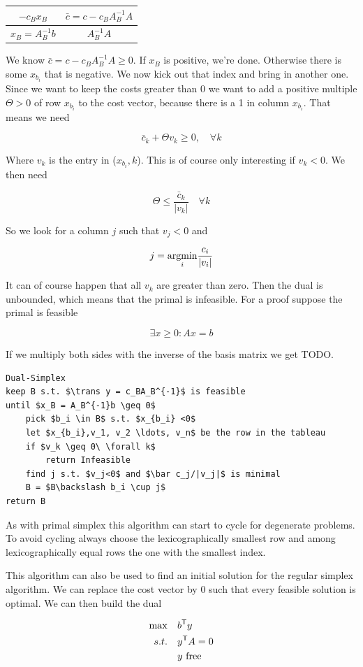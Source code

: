 \begin{center}
\begin{tabular}{c|c}
$-c_Bx_B$ & $\bar c = c-c_BA_B^{-1}A$\\\hline
$x_B=A_B^{-1}b$ & $A_B^{-1}A$ 
\end{tabular}
\end{center}

We know $\bar c = c-c_BA_B^{-1}A \geq 0$. If $x_B$ is positive, we're done. Otherwise there is some $x_{b_i}$ that is negative. We now kick out that index and bring in another one. Since we want to keep the costs greater than 0 we want to add a positive multiple $\Theta > 0$ of row $x_{b_i}$ to the cost vector, because there is a 1 in column $x_{b_i}$. That means we need

\[\bar c_k + \Theta v_k \geq 0,\quad \forall k\]

Where $v_k$ is the entry in ($x_{b_i}, k$). This is of course only interesting if $v_k<0$. We then need 

\[ \Theta \leq \frac{\bar c_k}{|v_k|} \quad \forall k\]

So we look for a column $j$ such that $v_j<0$ and 

\[j = \underset{i}{\operatorname{argmin}} \frac{c_i}{|v_i|}\]

It can of course happen that all $v_k$ are greater than zero. Then the dual is unbounded, which means that the primal is infeasible. For a proof suppose the primal is feasible

\[\exists x\geq 0: Ax=b\]

If we multiply both sides with the inverse of the basis matrix we get TODO.

\begin{lstlisting}
Dual-Simplex
keep B s.t. $\trans y = c_BA_B^{-1}$ is feasible
until $x_B = A_B^{-1}b \geq 0$
	pick $b_i \in B$ s.t. $x_{b_i} <0$
	let $x_{b_i},v_1, v_2 \ldots, v_n$ be the row in the tableau
	if $v_k \geq 0\ \forall k$
		return Infeasible
	find j s.t. $v_j<0$ and $\bar c_j/|v_j|$ is minimal
	B = $B\backslash b_i \cup j$
return B
\end{lstlisting}

As with primal simplex this algorithm can start to cycle for degenerate problems. To avoid cycling always choose the lexicographically smallest row and among lexicographically equal rows the one with the smallest index.

This algorithm can also be used to find an initial solution for the regular simplex algorithm. We can replace the cost vector by $0$ such that every feasible solution is optimal. We can then build the dual

\begin{align*}
\max \quad & {b}^\text{\upshape \sffamily T} y\\
s.t.\quad & {y}^\text{\upshape \sffamily T} A = 0\\
&y \text{ free}
\end{align*}